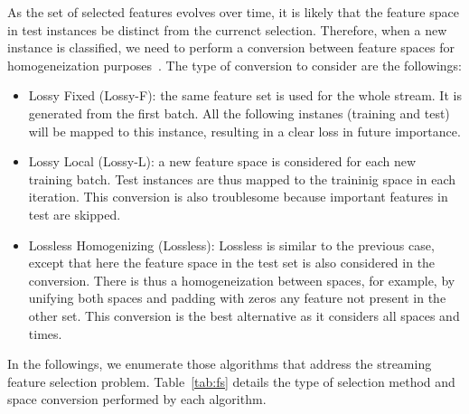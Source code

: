 \documentclass[preprint,12pt]{elsarticle}
\begin{document}
As the set of selected features evolves over time, it is likely that the feature space in test instances be distinct from the currenct selection. Therefore, when a new instance is classified, we need to perform a conversion between feature spaces for homogeneization purposes~\cite{masud10}. The type of conversion to consider are the followings: 
\begin{itemize}
	\item Lossy Fixed (Lossy-F): the same feature set is used for the whole stream. It is generated from the first batch. All the following instanes (training and test) will be mapped to this instance, resulting in a clear loss in future importance.
	\item Lossy Local (Lossy-L): a new feature space is considered for each new training batch. Test instances are thus mapped to the traininig space in each iteration. This conversion is also troublesome because important features in test are skipped.
	\item Lossless Homogenizing (Lossless): Lossless is similar to the previous case, except that here the feature space in the test set is also considered in the conversion. There is thus a homogeneization between spaces, for example, by unifying both spaces and padding with zeros any feature not present in the other set. This conversion is the best alternative as it considers all spaces and times.
\end{itemize}

In the followings, we enumerate those algorithms that address the streaming feature selection problem. Table~\ref{tab:fs} details the type of selection method and space conversion performed by each algorithm.
\end{document}
